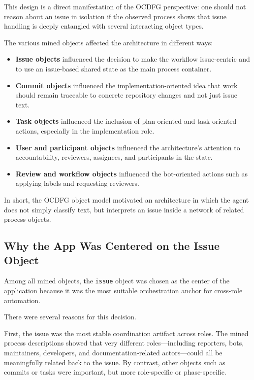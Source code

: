 \documentclass[11pt,a4paper]{article}
\begin{document}
This design is a direct manifestation of the OCDFG perspective: one should not reason about an issue in isolation if the observed process shows that issue handling is deeply entangled with several interacting object types.

The various mined objects affected the architecture in different ways:
\begin{itemize}
    \item \textbf{Issue objects} influenced the decision to make the workflow issue-centric and to use an issue-based shared state as the main process container.
    \item \textbf{Commit objects} influenced the implementation-oriented idea that work should remain traceable to concrete repository changes and not just issue text.
    \item \textbf{Task objects} influenced the inclusion of plan-oriented and task-oriented actions, especially in the implementation role.
    \item \textbf{User and participant objects} influenced the architecture's attention to accountability, reviewers, assignees, and participants in the state.
    \item \textbf{Review and workflow objects} influenced the bot-oriented actions such as applying labels and requesting reviewers.
\end{itemize}

In short, the OCDFG object model motivated an architecture in which the agent does not simply classify text, but interprets an issue inside a network of related process objects.

\subsection{Why the App Was Centered on the Issue Object}

Among all mined objects, the \texttt{issue} object was chosen as the center of the application because it was the most suitable orchestration anchor for cross-role automation.

There were several reasons for this decision.

First, the issue was the most stable coordination artifact across roles. The mined process descriptions showed that very different roles---including reporters, bots, maintainers, developers, and documentation-related actors---could all be meaningfully related back to the issue. By contrast, other objects such as commits or tasks were important, but more role-specific or phase-specific.
\end{document}
